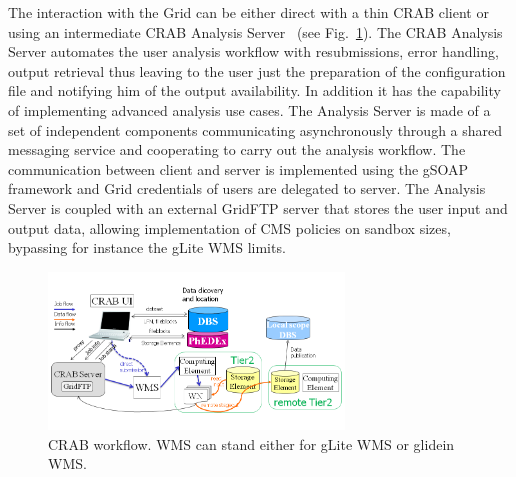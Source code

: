 The interaction with the Grid can be either direct with a thin CRAB client or using an intermediate CRAB Analysis Server~\cite{RefCRAB} (see Fig.~\ref{fig:CRABWorkflow}). The CRAB Analysis Server automates the user analysis workflow with resubmissions, error handling, output retrieval thus leaving to the user just the preparation of the configuration file and notifying him of the output availability. In addition it has the capability of implementing advanced analysis use cases.
The Analysis Server is made of a set of independent components communicating asynchronously through a shared messaging service and cooperating to carry out the analysis workflow. The communication between client and server is implemented using the gSOAP framework and Grid credentials of users are delegated to server.
The Analysis Server is coupled with an external GridFTP server %
 that stores the user input and output data, allowing implementation of CMS policies on sandbox sizes, bypassing for instance the gLite WMS limits.


\begin{figure}
 \includegraphics[width=0.70\textwidth]{figures/CRABWorkflow.png}
\caption{CRAB workflow. WMS can stand either for gLite WMS or glidein WMS.}
\label{fig:CRABWorkflow}
\end{figure}

